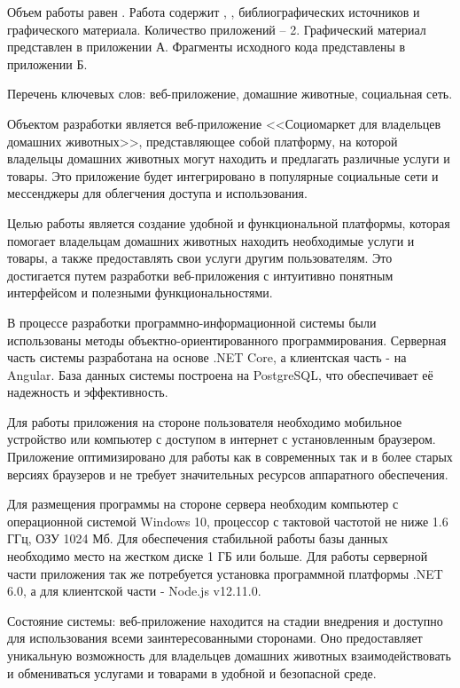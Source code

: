 
Объем работы равен . Работа содержит , ,  библиографических источников и  графического материала. Количество приложений – 2. Графический материал представлен в приложении А. Фрагменты исходного кода представлены в приложении Б.

Перечень ключевых слов: веб-приложение, домашние животные, социальная сеть.

Объектом разработки является веб-приложение <<Социомаркет для владельцев домашних животных>>, представляющее собой платформу, на которой владельцы домашних животных могут находить и предлагать различные услуги и товары. Это приложение будет интегрировано в популярные социальные сети и мессенджеры для облегчения доступа и использования.

Целью работы является создание удобной и функциональной платформы, которая помогает владельцам домашних животных находить необходимые услуги и товары, а также предоставлять свои услуги другим пользователям. Это достигается путем разработки веб-приложения с интуитивно понятным интерфейсом и полезными функциональностями.

В процессе разработки программно-информационной системы были использованы методы объектно-ориентированного программирования. Серверная часть системы разработана на основе .NET Core, а клиентская часть -\- на Angular. База данных системы построена на PostgreSQL, что обеспечивает её надежность и эффективность.

Для работы приложения на стороне пользователя необходимо мобильное устройство или компьютер с доступом в интернет с установленным браузером. Приложение оптимизировано для работы как в современных так и в более старых версиях браузеров и не требует значительных ресурсов аппаратного обеспечения.

Для размещения программы на стороне сервера необходим компьютер с операционной системой Windows 10, процессор с тактовой частотой не ниже 1.6 ГГц, ОЗУ 1024 Мб. Для обеспечения стабильной работы базы данных необходимо место на жестком диске 1 ГБ или больше. Для работы серверной части приложения так же потребуется установка программной платформы .NET 6.0, а для клиентской части -\- Node.js v12.11.0.

Состояние системы: веб-приложение находится на стадии внедрения и доступно для использования всеми заинтересованными сторонами. Оно предоставляет уникальную возможность для владельцев домашних животных взаимодействовать и обмениваться услугами и товарами в удобной и безопасной среде.


